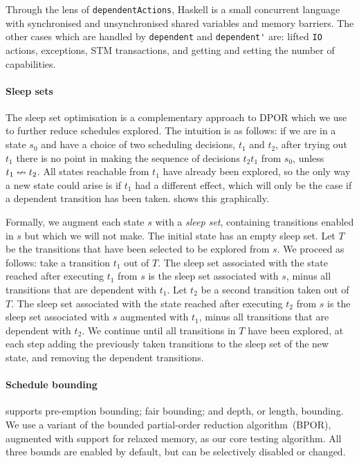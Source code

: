 Through the lens of \verb|dependentActions|, Haskell is a small
concurrent language with synchronised and unsynchronised shared
variables and memory barriers.  The other cases which are handled by
\verb|dependent| and \verb|dependent'| are: lifted \verb|IO| actions,
exceptions, STM transactions, and getting and setting the number of
capabilities.

\paragraph{Sleep sets}
The sleep set optimisation\cite{godefroid1996} is a complementary
approach to DPOR which we use to further reduce schedules explored.
The intuition is as follows: if we are in a state $s_{0}$ and have a
choice of two scheduling decisions, $t_{1}$ and $t_{2}$, after trying
out $t_{1}$ there is no point in making the sequence of decisions
$t_{2}t_{1}$ from $s_{0}$, unless $t_{1} \nleftrightarrow t_{2}$.  All
states reachable from $t_{1}$ have already been explored, so the only
way a new state could arise is if $t_{1}$ had a different effect,
which will only be the case if a dependent transition has been taken.
 shows this graphically.

Formally, we augment each state $s$ with a \emph{sleep set},
containing transitions enabled in $s$ but which we will not make.  The
initial state has an empty sleep set.  Let $T$ be the transitions that
have been selected to be explored from $s$.  We proceed as follows:
take a transition $t_{1}$ out of $T$.  The sleep set associated with
the state reached after executing $t_{1}$ from $s$ is the sleep set
associated with $s$, minus all transitions that are dependent with
$t_{1}$.  Let $t_{2}$ be a second transition taken out of $T$.  The
sleep set associated with the state reached after executing $t_{2}$
from $s$ is the sleep set associated with $s$ augmented with $t_{1}$,
minus all transitions that are dependent with $t_{2}$.  We continue
until all transitions in $T$ have been explored, at each step adding
the previously taken transitions to the sleep set of the new state,
and removing the dependent transitions.

\paragraph{Schedule bounding}
\dejafu{} supports pre-emption bounding\cite{musuvathi2007}; fair
bounding\cite{musuvathi2008}; and depth, or length,
bounding\cite{russell2002}.  We use a variant of the bounded
partial-order reduction algorithm~(BPOR)\cite{coons2013}, augmented
with support for relaxed memory\cite{zhang2015}, as our core testing
algorithm.  All three bounds are enabled by default, but can be
selectively disabled or changed.

